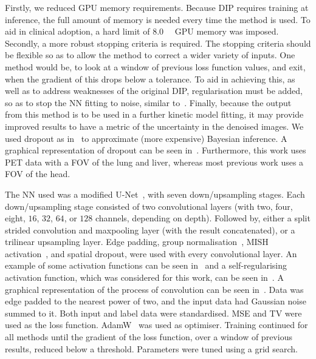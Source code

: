             Firstly, we reduced \gls{GPU} memory requirements. Because \gls{DIP} requires training at inference, the full amount of memory is needed every time the method is used. To aid in clinical adoption, a hard limit of \SI{8.0}{\giga\byte} \gls{GPU} memory was imposed. Secondly, a more robust stopping criteria is required. The stopping criteria should be flexible so as to allow the method to correct a wider variety of inputs.  One method would be, to look at a window of previous loss function values, and exit, when the gradient of this drops below a tolerance. To aid in achieving this, as well as to address weaknesses of the original \gls{DIP}, regularisation must be added, so as to stop the \gls{NN} fitting to noise, similar to~\parencite{Liu2019ImagePrior}. Finally, because the output from this method is to be used in a further kinetic model fitting, it may provide improved results to have a metric of the uncertainty in the denoised images. We used dropout as in~\parencite{Gal2016DropoutLearning} to approximate (more expensive) Bayesian inference. A graphical representation of dropout can be seen in~. Furthermore, this work uses \gls{PET} data with a \gls{FOV} of the lung and liver, whereas most previous work uses a \gls{FOV} of the head.
        
            The \gls{NN} used was a modified U-Net~\parencite{Weng2021INet:Segmentation}, with seven down/upsampling stages. Each down/upsampling stage consisted of two convolutional layers (with two, four, eight, $16$, $32$, $64$, or $128$ channels, depending on depth). Followed by, either a split strided convolution and maxpooling layer (with the result concatenated), or a trilinear upsampling layer. Edge padding, group normalisation~\parencite{Wu2020GroupNormalization}, MISH activation~\parencite{Misra2019Mish:Function}, and spatial dropout, were used with every convolutional layer. An example of some activation functions can be seen in~ and a self-regularising activation function, which was considered for this work, can be seen in~. A graphical representation of the process of convolution can be seen in~. Data was edge padded to the nearest power of two, and the input data had Gaussian noise summed to it. Both input and label data were standardised. \gls{MSE} and \gls{TV} were used as the loss function. AdamW~\parencite{Loshchilov2019DecoupledRegularization} was used as optimiser. Training continued for all methods until the gradient of the loss function, over a window of previous results, reduced below a threshold. Parameters were tuned using a grid search.
            
